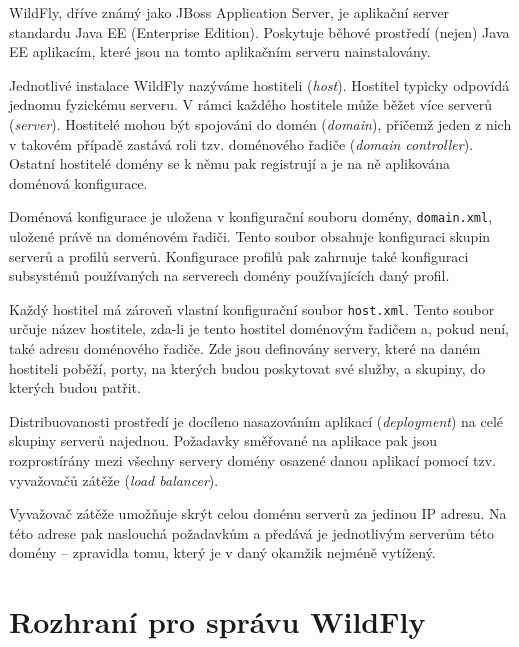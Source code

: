WildFly, dříve známý jako JBoss Application Server, je aplikační server standardu Java EE (Enterprise Edition).
Poskytuje běhové prostředí (nejen) Java EE aplikacím, které jsou na tomto aplikačním serveru nainstalovány.
\cite{wildflyRename}

Jednotlivé instalace WildFly nazýváme hostiteli ({\it host}). Hostitel typicky odpovídá jednomu fyzickému serveru.
V rámci každého hostitele může běžet více serverů ({\it server}).
Hostitelé mohou být spojováni do domén ({\it domain}), přičemž jeden z nich v takovém případě zastává roli tzv. doménového řadiče ({\it domain controller}).
Ostatní hostitelé domény se k němu pak registrují a je na ně aplikována doménová konfigurace.
\cite{jbossDomainSetup}

Doménová konfigurace je uložena v konfigurační souboru domény, {\tt domain.xml}, uložené právě na doménovém řadiči.
Tento soubor obsahuje konfiguraci skupin serverů a profilů serverů.
Konfigurace profilů pak zahrnuje také konfiguraci subsystémů používaných na serverech domény používajících daný profil.
\cite{jbossDomainSetup}

Každý hostitel má zároveň vlastní konfigurační soubor {\tt host.xml}.
Tento soubor určuje název hostitele, zda-li je tento hostitel doménovým řadičem a, pokud není, také adresu doménového řadiče.
Zde jsou definovány servery, které na daném hostiteli poběží, porty, na kterých budou poskytovat své služby, a skupiny, do kterých budou patřit.
\cite{jbossDomainSetup}

Distribuovanosti prostředí je docíleno nasazováním aplikací ({\it deployment}) na celé skupiny serverů najednou.
Požadavky směřované na aplikace pak jsou rozprostírány mezi všechny servery domény osazené danou aplikací pomocí tzv. vyvažovačů zátěže ({\it load balancer}).
\cite{jbossLoadBalancing}

Vyvažovač zátěže umožňuje skrýt celou doménu serverů za jedinou IP adresu.
Na této adrese pak naslouchá požadavkům a předává je jednotlivým serverům této domény -- zpravidla tomu, který je v daný okamžik nejméně vytížený.
\cite{jbossLoadBalancing}

\section{Rozhraní pro správu WildFly} \label{managementAPI}

